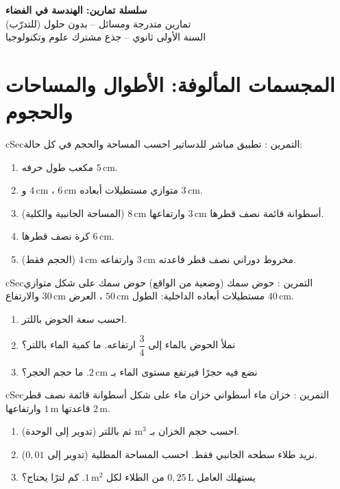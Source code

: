 \documentclass[12pt,a4paper]{article}
\newenvironment{BOX}[2]{\begin{otherlanguage}{english}\begin{arbox}{#1}{#2}}{\end{arbox}\end{otherlanguage}}
\newcounter{exo}
\newenvironment{tamrin}[1]{\stepcounter{exo}\begin{BOX}{cSec}{التمرين \theexo: #1}}{\end{BOX}}
\newenvironment{LTR}{\begin{otherlanguage}{english}}{\end{otherlanguage}}
\begin{document}
\begin{LTR}
\begin{tcolorbox}[enhanced,colback=cSec!10,colframe=cSec!40,arc=3mm,halign=center,boxrule=0.6pt,top=12pt,bottom=12pt,before upper={\selectlanguage{arabic}}]
{\color{cSec}\fontsize{26}{32}\selectfont\bfseries سلسلة تمارين: الهندسة في الفضاء}\\[8pt]
{\color{cSec!80!black}\large تمارين متدرجة ومسائل -- بدون حلول (للتدرّب)}\\[5pt]
{\color{cSec!80!black}\large السنة الأولى ثانوي -- جذع مشترك علوم وتكنولوجيا}
\end{tcolorbox}
\end{LTR}

\section{المجسمات المألوفة: الأطوال والمساحات والحجوم}
\begin{tamrin}{تطبيق مباشر للدساتير}
احسب المساحة والحجم في كل حالة:
\begin{enumerate}
\item مكعب طول حرفه $5\,\mathrm{cm}$.
\item متوازي مستطيلات أبعاده $6\,\mathrm{cm}$ ، $4\,\mathrm{cm}$ و $3\,\mathrm{cm}$.
\item أسطوانة قائمة نصف قطرها $3\,\mathrm{cm}$ وارتفاعها $8\,\mathrm{cm}$ (المساحة الجانبية والكلية).
\item كرة نصف قطرها $6\,\mathrm{cm}$.
\item مخروط دوراني نصف قطر قاعدته $3\,\mathrm{cm}$ وارتفاعه $4\,\mathrm{cm}$ (الحجم فقط).
\end{enumerate}
\end{tamrin}

\begin{tamrin}{حوض سمك (وضعية من الواقع)}
حوض سمك على شكل متوازي مستطيلات أبعاده الداخلية: الطول $50\,\mathrm{cm}$ ، العرض $30\,\mathrm{cm}$ والارتفاع $40\,\mathrm{cm}$.
\begin{enumerate}
\item احسب سعة الحوض باللتر.
\item نملأ الحوض بالماء إلى $\dfrac34$ ارتفاعه. ما كمية الماء باللتر؟
\item نضع فيه حجرًا فيرتفع مستوى الماء بـ $2\,\mathrm{cm}$. ما حجم الحجر؟
\end{enumerate}
\end{tamrin}

\begin{tamrin}{خزان ماء أسطواني}
خزان ماء على شكل أسطوانة قائمة نصف قطر قاعدتها $1\,\mathrm{m}$ وارتفاعها $2\,\mathrm{m}$.
\begin{enumerate}
\item احسب حجم الخزان بـ $\mathrm{m}^3$ ثم باللتر (تدوير إلى الوحدة).
\item نريد طلاء سطحه الجانبي فقط. احسب المساحة المطلية (تدوير إلى $0{,}01$).
\item يستهلك العامل $0{,}25\,\mathrm{L}$ من الطلاء لكل $1\,\mathrm{m}^2$. كم لترًا يحتاج؟
\end{enumerate}
\end{tamrin}
\end{document}
